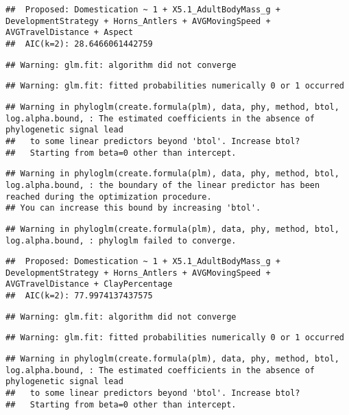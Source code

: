 \documentclass[
]{article}
\begin{document}
\begin{verbatim}
##  Proposed: Domestication ~ 1 + X5.1_AdultBodyMass_g + DevelopmentStrategy + Horns_Antlers + AVGMovingSpeed + AVGTravelDistance + Aspect
##  AIC(k=2): 28.6466061442759
\end{verbatim}

\begin{verbatim}
## Warning: glm.fit: algorithm did not converge
\end{verbatim}

\begin{verbatim}
## Warning: glm.fit: fitted probabilities numerically 0 or 1 occurred
\end{verbatim}

\begin{verbatim}
## Warning in phyloglm(create.formula(plm), data, phy, method, btol, log.alpha.bound, : The estimated coefficients in the absence of phylogenetic signal lead
##   to some linear predictors beyond 'btol'. Increase btol?
##   Starting from beta=0 other than intercept.
\end{verbatim}

\begin{verbatim}
## Warning in phyloglm(create.formula(plm), data, phy, method, btol, log.alpha.bound, : the boundary of the linear predictor has been reached during the optimization procedure.
## You can increase this bound by increasing 'btol'.
\end{verbatim}

\begin{verbatim}
## Warning in phyloglm(create.formula(plm), data, phy, method, btol, log.alpha.bound, : phyloglm failed to converge.
\end{verbatim}

\begin{verbatim}
##  Proposed: Domestication ~ 1 + X5.1_AdultBodyMass_g + DevelopmentStrategy + Horns_Antlers + AVGMovingSpeed + AVGTravelDistance + ClayPercentage
##  AIC(k=2): 77.9974137437575
\end{verbatim}

\begin{verbatim}
## Warning: glm.fit: algorithm did not converge
\end{verbatim}

\begin{verbatim}
## Warning: glm.fit: fitted probabilities numerically 0 or 1 occurred
\end{verbatim}

\begin{verbatim}
## Warning in phyloglm(create.formula(plm), data, phy, method, btol, log.alpha.bound, : The estimated coefficients in the absence of phylogenetic signal lead
##   to some linear predictors beyond 'btol'. Increase btol?
##   Starting from beta=0 other than intercept.
\end{verbatim}
\end{document}
